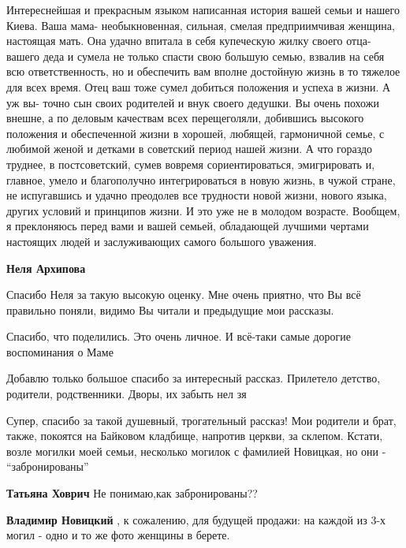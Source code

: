 \begin{itemize}
Интереснейшая и прекрасным языком написанная история вашей семьи и нашего
Киева. Ваша мама- необыкновенная, сильная, смелая предприимчивая женщина,
настоящая мать. Она удачно впитала в себя купеческую жилку своего отца- вашего
деда и сумела не только спасти свою большую семью, взвалив на себя всю
ответственность, но и обеспечить вам вполне достойную жизнь в то тяжелое для
всех время. Отец ваш тоже сумел добиться положения и успеха в жизни. А уж вы-
точно сын своих родителей и внук своего дедушки. Вы очень похожи внешне, а по
деловым качествам всех перещеголяли, добившись высокого положения и
обеспеченной жизни в хорошей, любящей, гармоничной семье, с любимой женой и
детками в советский период нашей жизни. А что гораздо труднее, в постсоветский,
сумев вовремя сориентироваться, эмигрировать и, главное, умело и благополучно
интегрироваться в новую жизнь, в чужой стране, не испугавшись и удачно
преодолев все трудности новой жизни, нового языка, других условий и принципов
жизни. И это уже не в молодом возрасте. Вообщем, я преклоняюсь перед вами и
вашей семьей, обладающей лучшими чертами настоящих людей и заслуживающих самого
большого уважения.

\begin{itemize} %
\textbf{Неля Архипова} 

Спасибо Неля за такую высокую оценку. Мне очень приятно, что Вы всё правильно
поняли, видимо Вы читали и предыдущие мои рассказы.
\end{itemize} %


Спасибо, что поделились. Это очень личное. И всё-таки самые дорогие воспоминания о Маме


Добавлю только большое спасибо за интересный рассказ. Прилетело детство,
родители, родственники. Дворы, их забыть нел зя



Супер, спасибо за такой душевный, трогательный рассказ! Мои родители и брат,
также, покоятся на Байковом кладбище, напротив церкви, за склепом. Кстати,
возле могилки моей семьи, несколько могилок с фамилией Новицкая, но они -
\enquote{забронированы}

\begin{itemize} %
\textbf{Татьяна Ховрич} Не понимаю,как забронированы??

\textbf{Владимир Новицкий} , к сожалению, для будущей продажи: на каждой из 3-х могил - одно и то же фото женщины в берете.


\end{itemize}
\end{itemize}
